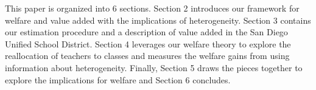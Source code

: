 \documentclass[12pt]{article}
\theoremstyle{definition}
\theoremstyle{definition}
\theoremstyle{definition}
\theoremstyle{definition}
\begin{document}













This paper is organized into 6 sections. Section 2 introduces our framework for welfare and value added with the implications of heterogeneity. Section 3 contains our estimation procedure and a description of value added in the San Diego Unified School District. Section 4 leverages our welfare theory to explore the reallocation of teachers to classes and measures the welfare gains from using information about heterogeneity. Finally, Section 5 draws the pieces together to explore the implications for welfare and Section 6 concludes.




\end{document}
